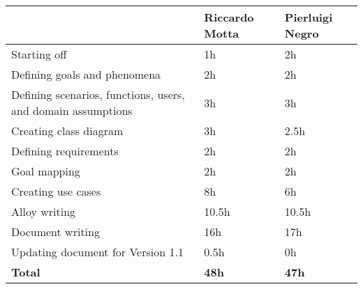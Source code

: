\begin{center}
    \begin{tabular}{ | >{\arraybackslash}m{} | >{\centering\arraybackslash}m{} | >{\centering\arraybackslash}m{} | }
        \hline
        \multicolumn{1}{|c|}{\textbf{Task}} & \textbf{Riccardo Motta} & \textbf{Pierluigi Negro} \\
        \hline
        \hline
        Starting off & 1h & 2h \\
        \hline
        Defining goals and phenomena & 2h & 2h \\
        \hline
        Defining scenarios, functions, users, and domain assumptions & 3h & 3h \\
        \hline
        Creating class diagram & 3h & 2.5h \\
        \hline
        Defining requirements & 2h & 2h \\
        \hline
        Goal mapping & 2h & 2h \\
        \hline
        Creating use cases & 8h & 6h \\
        \hline
        Alloy writing & 10.5h & 10.5h \\
        \hline
        Document writing & 16h & 17h \\
        \hline
        Updating document for Version 1.1 & 0.5h & 0h \\
        \hline
        \hline
        \textbf{Total} & \textbf{48h} & \textbf{47h} \\
        \hline
    \end{tabular}
\end{center}
